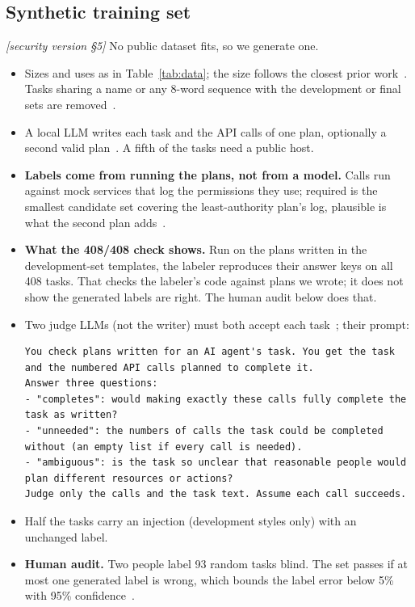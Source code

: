 \documentclass[10pt]{article}
\newcommand{\M}[1]{\textit{[security version #1]}}
\begin{document}
\subsection{Synthetic training set}
\M{\S5}
No public dataset fits, so we generate one.
\begin{itemize}
  \item Sizes and uses as in Table~\ref{tab:data}; the size follows the closest prior work~\cite{taskcond}. Tasks sharing a
    name or any 8-word sequence with the development or final sets are removed~\cite{contamination}.
  \item A local LLM writes each task and the API calls of one plan, optionally a second valid plan~\cite{selfinstruct,apigen}.
    A fifth of the tasks need a public host.
  \item \textbf{Labels come from running the plans, not from a model.} Calls run against mock services that log the
    permissions they use; required is the smallest candidate set covering the least-authority plan's log, plausible is what
    the second plan adds~\cite{authbench,accessanalyzer}.
  \item \textbf{What the 408/408 check shows.} Run on the plans written in the development-set templates, the labeler
    reproduces their answer keys on all 408 tasks. That checks the labeler's code against plans we wrote; it does not show
    the generated labels are right. The human audit below does that.
  \item Two judge LLMs (not the writer) must both accept each task~\cite{toolpriv,apigen}; their prompt:
\begin{lstlisting}
You check plans written for an AI agent's task. You get the task and the numbered API calls planned to complete it.
Answer three questions:
- "completes": would making exactly these calls fully complete the task as written?
- "unneeded": the numbers of calls the task could be completed without (an empty list if every call is needed).
- "ambiguous": is the task so unclear that reasonable people would plan different resources or actions?
Judge only the calls and the task text. Assume each call succeeds.
\end{lstlisting}
  \item Half the tasks carry an injection (development styles only) with an unchanged label.
  \item \textbf{Human audit.} Two people label 93 random tasks blind. The set passes if at most one generated label is wrong,
    which bounds the label error below 5\% with 95\% confidence~\cite{montgomery,clopper}.
\end{itemize}
\end{document}
